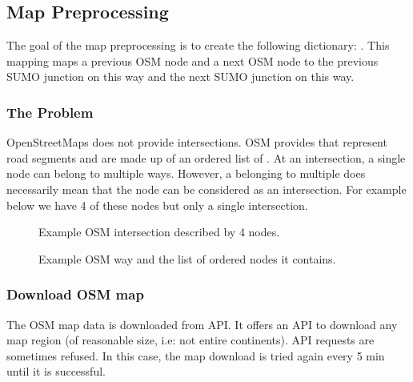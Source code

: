 \documentclass[letterpaper,10pt,english]{sphinxmanual}
\begin{document}
\subsection{Map Preprocessing}
\label{\detokenize{microservices/map_preprocessing/map_preprocessing:map-preprocessing}}\label{\detokenize{microservices/map_preprocessing/map_preprocessing::doc}}
The goal of the map preprocessing is to create the following dictionary: .
This mapping maps a previous OSM node and a next OSM node to the previous SUMO junction on this way and the next SUMO junction on this way.


\subsubsection{The Problem}
\label{\detokenize{microservices/map_preprocessing/map_preprocessing:the-problem}}
OpenStreetMaps does not provide intersections.
OSM provides  that represent road segments and are made up of an ordered list of .
At an intersection, a single node can belong to multiple ways.
However, a  belonging to multiple  does necessarily mean that the node can be considered as an intersection.
For example below we have 4 of these nodes but only a single intersection.

\begin{figure}[htbp]
\centering
\capstart

\noindent{}
\caption{Example OSM intersection described by 4 nodes.}\label{\detokenize{microservices/map_preprocessing/map_preprocessing:id1}}\end{figure}

\begin{figure}[htbp]
\centering
\capstart

\noindent{}
\caption{Example OSM way and the list of ordered nodes it contains.}\label{\detokenize{microservices/map_preprocessing/map_preprocessing:id2}}\end{figure}


\subsubsection{Download OSM map}
\label{\detokenize{microservices/map_preprocessing/map_preprocessing:download-osm-map}}
The OSM map data is downloaded from  API.
It offers an API to download any map region (of reasonable size, i.e: not entire continents).
API requests are sometimes refused. In this case, the map download is tried again every 5 min until it is successful.
\end{document}
